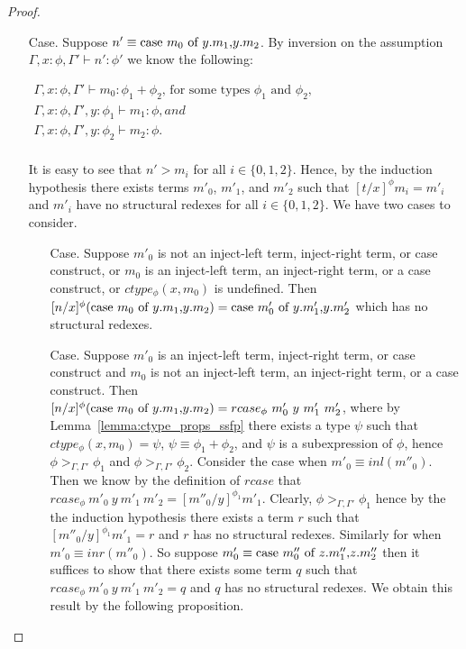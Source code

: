 \begin{proof}
\begin{itemize}
\item[Case.] Suppose $n' \equiv \mbox{case}\ m_0\ \text{of}\ y\text{.}m_1\text{,}y\text{.}m_2$. By inversion on the assumption
  $\Gamma,x:\phi,\Gamma' \vdash n':\phi'$ we know the following:
  \begin{center}
    \begin{math}
      \begin{array}{lll}
        \Gamma,x:\phi,\Gamma' \vdash m_0:\phi_1+\phi_2 \text{, for some types } \phi_1 \text{ and } \phi_2,\\
        \Gamma,x:\phi,\Gamma',y:\phi_1 \vdash m_1:\phi, and\\
        \Gamma,x:\phi,\Gamma',y:\phi_2 \vdash m_2:\phi.\\
      \end{array}
    \end{math}
  \end{center}
  It is easy to see that
  $n' > m_i$ for all $i \in \{0,1,2\}$.  Hence, by the induction hypothesis
  there exists terms $m'_0$, $m'_1$, and $m'_2$ such that $[t/x]^\phi m_i = m'_i$ and $m'_i$ have no structural redexes
  for all $i \in \{0,1,2\}$.  We have two cases to consider.
  \begin{itemize}
  \item[Case.] Suppose $m'_0$ is not an inject-left term, inject-right term, or case construct, or
    $m_0$ is an inject-left term, an inject-right term, or a case construct, or $ctype_\phi(x,m_0)$ is undefined.
    Then \\
    $[n/x]^{\phi} (\mbox{case}\ m_0\ \text{of}\ y\text{.}m_1\text{,}y\text{.}m_2) = \mbox{case}\ m'_0\ \text{of}\ y\text{.}m'_1\text{,}y\text{.}m'_2$ which has no structural redexes.
    
  \item[Case.] Suppose $m'_0$ is an inject-left term, inject-right term, or case construct and $m_0$ is not
    an inject-left term, an inject-right term, or a case construct.  Then\\
    $[n/x]^{\phi} (\mbox{case}\ m_0\ \text{of}\ y\text{.}m_1\text{,}y\text{.}m_2) = rcase_{\phi}\ m'_0\ y\ m'_1\ m'_2$, where by Lemma~\ref{lemma:ctype_props_ssfp}
    there exists a type $\psi$ such that $ctype_\phi(x,m_0) = \psi$, $\psi \equiv \phi_1+\phi_2$, and $\psi$ is a subexpression
    of $\phi$, hence $\phi >_{\Gamma,\Gamma'} \phi_1$ and $\phi >_{\Gamma,\Gamma'} \phi_2$.
    Consider the case when $m'_0 \equiv inl(m''_0)$.  Then we know by the definition of $rcase$ that
    $rcase_{\phi}\ m'_0\ y\ m'_1\ m'_2 = [m''_0/y]^{\phi_1} m'_1$.  Clearly, $\phi >_{\Gamma,\Gamma'} \phi_1$ hence
    by the the induction hypothesis there exists a term $r$ such that $[m''_0/y]^{\phi_1} m'_1 = r$ and
    $r$ has no structural redexes. Similarly for when $m'_0 \equiv inr(m''_0)$.  
    So suppose $m'_0 \equiv \mbox{case}\ m''_0\ \text{of}\ z\text{.}m''_1\text{,}z\text{.}m''_2$ then it suffices to show that there exists some term
    $q$ such that $rcase_{\phi}\ m'_0\ y\ m'_1\ m'_2 = q$ and $q$ has no structural redexes.  We obtain this
    result by the following proposition.
      

\end{itemize}
\end{itemize}
\end{proof}
